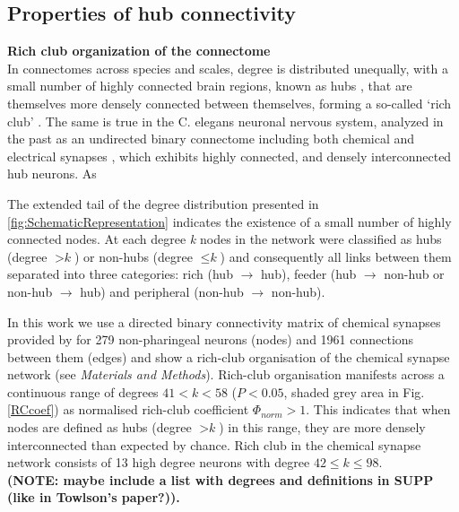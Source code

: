 \documentclass[10pt,letterpaper]{article}
\begin{document}
\subsection*{Properties of hub connectivity}
\textbf{Rich club organization of the connectome}\\

In connectomes across species and scales, degree is distributed unequally, with a small number of highly connected brain regions, known as hubs \cite{Sporns:2007ea}, that are themselves more densely connected between themselves, forming a so-called `rich club' \cite{deReus:2013cy, ZamoraLopez:2010hy, Shih:2015cu, vandenHeuvel:2012kh, vandenHeuvel:2011he}.
The same is true in the C. elegans neuronal nervous system, analyzed in the past as an undirected binary connectome including both chemical and electrical synapses \cite{Towlson:2013gf}, which exhibits highly connected, and densely interconnected hub neurons.
As 


The extended tail of the degree distribution presented in \ref{fig:SchematicRepresentation} indicates the existence of a small number of highly connected nodes.
At each degree \textit{k} nodes in the network were classified as hubs (degree $>\textit{k}$) or non-hubs (degree $\leq\textit{k}$) and consequently all links between them separated into three categories: rich (hub $\rightarrow$ hub), feeder (hub $\rightarrow$ non-hub or non-hub $\rightarrow$ hub) and peripheral (non-hub $\rightarrow$ non-hub).


In this work we use a directed binary connectivity matrix of chemical synapses provided by \citet{Varshney2011} for 279 non-pharingeal neurons (nodes) and 1961 connections between them (edges) and show a rich-club organisation of the chemical synapse network (see \textit{Materials and Methods}).
Rich-club organisation manifests across a continuous range of degrees $41<k<58$ ($P<0.05$, shaded grey area in Fig.\ref{RCcoef}) as normalised rich-club coefficient $\Phi_{norm}>1$.
This indicates that when nodes are defined as hubs (degree $>\textit{k}$) in this range, they are more densely interconnected than expected by chance.
Rich club in the chemical synapse network consists of 13 high degree neurons with degree $42 \leq k \leq 98$. \\
\textbf{(NOTE: maybe include a list with degrees and definitions in SUPP (like in Towlson's paper?)).}
\end{document}
